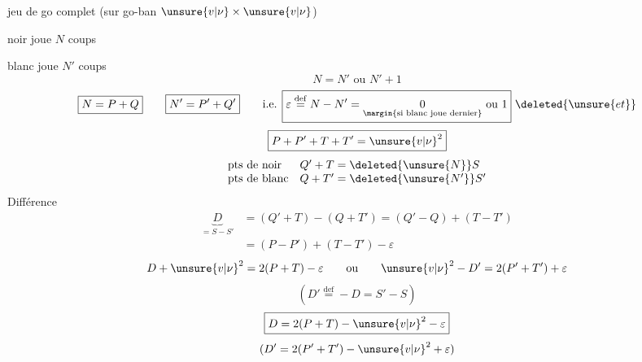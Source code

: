 jeu de go complet (sur go-ban $\unsure{v|\nu}\times\unsure{v|\nu}$)

noir joue $N$ coups

blanc joue $N'$ coups
\[
N=N'\text{ ou }N'+1
\]
\[
\boxed{N=P+Q}\qquad\boxed{N'=P'+Q'}\qquad\text{i.e. }\boxed{\varepsilon\overset{\mathrm{def}}{=}N-N'=\underset{\margin{\text{si blanc joue dernier}}}{0}\text{ ou }1}\ \deleted{\unsure{et}}
\]
\[
\boxed{P+P'+T+T'=\unsure{v|\nu}^2}
\]
\[
\begin{array}{ll}
\text{pts de noir}&Q'+T=\deleted{\unsure{N}}S\\
\text{pts de blanc}&Q+T'=\deleted{\unsure{N'}}S'
\end{array}
\]
Différence
\[
\begin{aligned}
\underbrace{D}_{=S-S'}&=(Q'+T)-(Q+T')=(Q'-Q)+(T-T')\\
&=(P-P')+(T-T')-\varepsilon
\end{aligned}
\]
\[
D+\unsure{v|\nu}^2=2(P+T)-\varepsilon
\qquad\text{ou}\qquad \unsure{v|\nu}^2-D'=2(P'+T')+\varepsilon
\]
\[
(D'\overset{\mathrm{def}}{=}-D=S'-S)
\]
\[
\boxed{D=2(P+T)-\unsure{v|\nu}^2-\varepsilon}
\]
\[
(D'=2(P'+T')-\unsure{v|\nu}^2+\varepsilon)
\]
